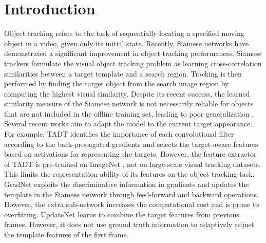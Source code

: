 \section{Introduction}
Object tracking refers to the task of sequentially locating a specified moving object in a video, given only its initial state. Recently, Siamese networks \cite{danelljan2019atom, bertinetto2016fully} have demonstrated a significant improvement in object tracking performances. Siamese trackers formulate the visual object tracking problem as learning cross-correlation similarities between a target template and a search region. Tracking is then performed by finding the target object from the search image region by computing the highest visual similarity. Despite its recent success, the learned similarity measure of the Siamese network is not necessarily reliable for objects that are not included in the offline training set, leading to poor generalization \cite{Bhat_2019_ICCV}. Several recent works aim to adapt the model to the current target appearance. For example, TADT \cite{Li_2019_CVPR} identifies the importance of each convolutional filter according to the back-propagated gradients and selects the target-aware features based on activations for representing the targets. However, the feature extractor of TADT is pre-trained on ImageNet \cite{russakovsky2015imagenet}, not on large-scale visual tracking datasets. This limits the representation ability of its features on the object tracking task. GradNet \cite{Li_2019_ICCV} exploits the discriminative information in gradients and updates the template in the Siamese network through feed-forward and backward operations. However, the extra sub-network increases the computational cost and is prone to overfitting. UpdateNet \cite{Zhang_2019_ICCV} learns to combine the target features from previous frames. However, it does not use ground truth information to adaptively adjust the template features of the first frame.

